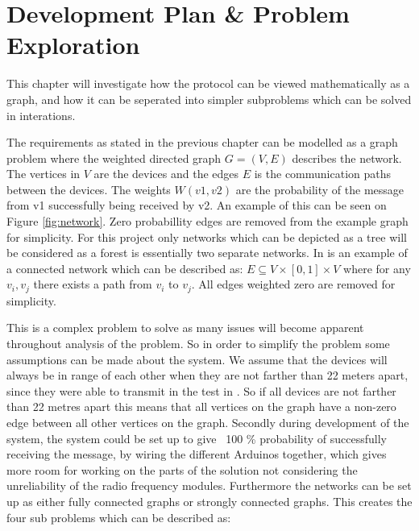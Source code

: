 \chapter{Development Plan \& Problem Exploration}
This chapter will investigate how the protocol can be viewed mathematically as a graph, and how it can be seperated into simpler subproblems which can be solved in interations.

\noindent The requirements as stated in the previous chapter can be modelled as a graph problem where the weighted directed graph $G = (V, E)$ describes the network. 
The vertices in $V$ are the devices and the edges $E$ is the communication paths between the devices. 
The weights $W(v1, v2)$ are the probability of the message from v1 successfully being received by v2.
An example of this can be seen on Figure \ref{fig:network}.
Zero probabillity edges are removed from the example graph for simplicity. 
For this project only networks which can be depicted as a tree will be considered as a forest is essentially two separate networks.
In  is an example of a connected network which can be described as: $E \subseteq V \times [0,1] \times V$ where for any $v_i, v_j$ there exists a path from $v_i$ to $v_j$.
All edges weighted zero are removed for simplicity.


\noindent This is a complex problem to solve as many issues will become apparent throughout analysis of the problem.
So in order to simplify the problem some assumptions can be made about the system.
We assume that the devices will always be in range of each other when they are not farther than 22 meters apart, since they were able to transmit in the test in  .
So if all devices are not farther than 22 metres apart this means that all vertices on the graph have a non-zero edge between all other vertices on the graph.
Secondly during development of the system, the system could be set up to give ~100 \% probability of successfully receiving the message, by wiring the different Arduinos together, which gives more room for working on the parts of the solution not considering the unreliability of the radio frequency modules.
Furthermore the networks can be set up as either fully connected graphs or strongly connected graphs.
This creates the four sub problems which can be described as:  %

